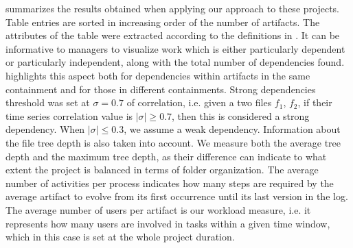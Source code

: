  summarizes the results obtained when applying our approach to these projects. Table entries are sorted in increasing order of the number of artifacts. The attributes of the table were extracted according to the definitions in . 
It can be informative to managers to visualize work which is either particularly dependent or particularly independent, along with the total number of dependencies found.  highlights this aspect both for dependencies within artifacts in the same containment and for those in different containments. Strong dependencies threshold was set at $\sigma=0.7$ of correlation, i.e. given a two files $f_1$, $f_2$, if their time series correlation value is $|\sigma| \geq 0.7$, then this is considered a strong dependency. When $|\sigma| \leq 0.3$, we assume a weak dependency. 
Information about the file tree depth is also taken into account. We measure both the average tree depth and the maximum tree depth, as their difference can indicate to what extent the project is balanced in terms of folder organization.
The average number of activities per process indicates how many steps are required by the average artifact to evolve from its first occurrence until its last version in the log. The average number of users per artifact is our workload measure, i.e. it represents how many users are involved in tasks within a given time window, which in this case is set at the whole project duration.

